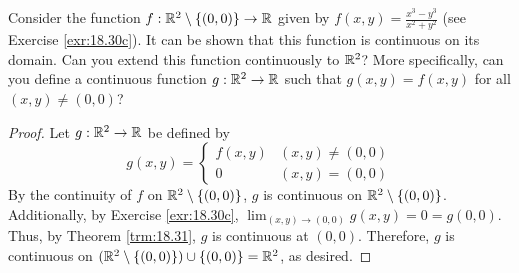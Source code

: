 \documentclass[../main.tex]{subfiles}
\begin{document}
\begin{exercise}\label{exr:18.33}
    Consider the function $f:\mathbb{R}^2\setminus\{(0,0)\}\to\mathbb{R}$ given by $f(x,y)=\frac{x^3-y^3}{x^2+y^2}$ (see Exercise \ref{exr:18.30c}). It can be shown that this function is continuous on its domain. Can you extend this function continuously to $\mathbb{R}^2$? More specifically, can you define a continuous function $g:\mathbb{R}^2\to\mathbb{R}$ such that $g(x,y)=f(x,y)$ for all $(x,y)\neq(0,0)$?
    \begin{proof}
        Let $g:\mathbb{R}^2\to\mathbb{R}$ be defined by
        \begin{equation*}
            g(x,y) =
            \begin{cases}
                f(x,y) & (x,y)\neq(0,0)\\
                0 & (x,y)=(0,0)
            \end{cases}
        \end{equation*}
        By the continuity of $f$ on $\mathbb{R}^2\setminus\{(0,0)\}$, $g$ is continuous on $\mathbb{R}^2\setminus\{(0,0)\}$. Additionally, by Exercise \ref{exr:18.30c}, $\lim_{(x,y)\to(0,0)}g(x,y)=0=g(0,0)$. Thus, by Theorem \ref{trm:18.31}, $g$ is continuous at $(0,0)$. Therefore, $g$ is continuous on $(\mathbb{R}^2\setminus\{(0,0)\})\cup\{(0,0)\}=\mathbb{R}^2$, as desired.
    \end{proof}
\end{exercise}
\end{document}
